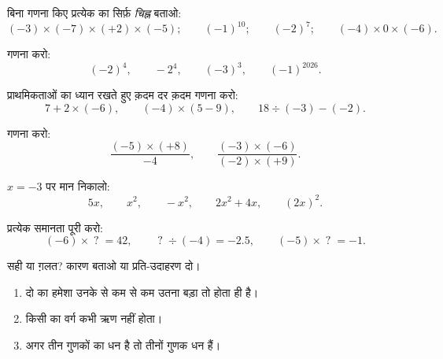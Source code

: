 \begin{exercise}[$\star$]\label{exo:g8:negprod:3}
बिना गणना किए प्रत्येक  का सिर्फ़ \emph{चिह्न} बताओ:
\[
(-3) \times (-7) \times (+2) \times (-5); \qquad
(-1)^{10}; \qquad
(-2)^{7}; \qquad
(-4) \times 0 \times (-6).
\]
\end{exercise}

\begin{exercise}[$\star$]\label{exo:g8:negprod:4}
गणना करो:
\[
(-2)^4, \qquad
-2^4, \qquad
(-3)^3, \qquad
(-1)^{2026} .
\]
\end{exercise}

\begin{exercise}[$\star$]\label{exo:g8:negprod:5}
प्राथमिकताओं का ध्यान रखते हुए क़दम दर क़दम गणना करो:
\[
7 + 2 \times (-6), \qquad
(-4) \times (5 - 9), \qquad
18 \div (-3) - (-2) .
\]
\end{exercise}

\begin{exercise}[$\star$]\label{exo:g8:negprod:6}
गणना करो:
\[
\frac{(-5) \times (+8)}{-4}, \qquad
\frac{(-3) \times (-6)}{(-2) \times (+9)} .
\]
\end{exercise}

\begin{exercise}[$\star$]\label{exo:g8:negprod:7}
$x = -3$ पर मान निकालो:
\[
5x, \qquad x^2, \qquad -x^2, \qquad 2x^2 + 4x, \qquad (2x)^2 .
\]
\end{exercise}

\begin{exercise}[$\star\star$]\label{exo:g8:negprod:8}
प्रत्येक समानता पूरी करो:
\[
(-6) \times \;?\; = 42, \qquad
\;?\; \div (-4) = -2.5, \qquad
(-5) \times \;?\; = -1 .
\]
\end{exercise}

\begin{exercise}[$\star\star$]\label{exo:g8:negprod:9}
सही या ग़लत? कारण बताओ या प्रति-उदाहरण दो।
\begin{enumerate}
  \item दो  का  हमेशा उनके  से कम से कम
        उतना बड़ा तो होता ही है।
  \item किसी  का वर्ग कभी ऋण नहीं होता।
  \item अगर तीन गुणकों का  धन है तो तीनों गुणक धन हैं।
\end{enumerate}
\end{exercise}

